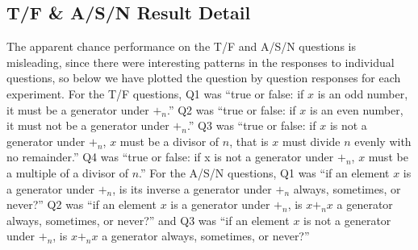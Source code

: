 \documentclass[man,10pt]{apa6}
\begin{document}
\subsection{T/F \& A/S/N Result Detail}
The apparent chance performance on the T/F and A/S/N questions is misleading, since there were interesting patterns in the responses to individual questions, so below we have plotted the question by question responses for each experiment. For the T/F questions, Q1 was ``true or false: if $x$ is an odd number, it must be a generator under $+_n$.'' Q2 was ``true or false: if $x$ is an even number, it must not be a generator under $+_n$.'' Q3 was ``true or false: if $x$ is not a generator under $+_n$, $x$ must be a divisor of $n$, that is $x$ must divide $n$ evenly with no remainder.'' Q4 was ``true or false: if x is not a generator under $+_n$, $x$ must be a multiple of a divisor of $n$.'' For the A/S/N questions, Q1 was ``if an element $x$ is a generator under $+_n$, is its inverse a generator under $+_n$ always, sometimes, or never?'' Q2 was ``if an element $x$ is a generator under $+_n$, is $x+_nx$ a generator always, sometimes, or never?'' and Q3 was ``if an element $x$ is not a generator under $+_n$, is $x +_n x$ a generator always, sometimes, or never?''
\end{document}
